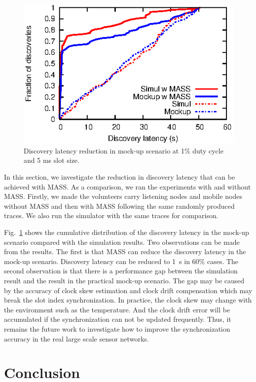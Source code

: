 \documentclass[twoside,twocolumn]{article}
\begin{document}
\begin{figure}[t]
   \centering
   \includegraphics{graphs/latency-mockup/latency-reduction}
   \caption{Discovery latency reduction in mock-up scenario at 1\% duty cycle and 5 ms slot size.}
   \label{fig:latency-reduction}
\end{figure}

In this section, we investigate the reduction in discovery latency that can be achieved with
MASS. As a comparison, we ran the experiments with and without MASS. Firstly, we made the volunteers
carry listening nodes and mobile nodes without MASS and then with MASS following the same randomly
produced traces. We also run the simulator with the same traces for comparison.

Fig.~\ref{fig:latency-reduction} shows the cumulative distribution of the discovery latency in the
mock-up scenario compared with the simulation results. Two observations can be made from the
results. The first is that MASS can reduce the discovery latency in the mock-up scenario. Discovery
latency can be reduced to 1~s in 60\% cases. The second observation is that there is a performance
gap between the simulation result and the result in the practical mock-up scenario. The gap may be
caused by the accuracy of clock skew estimation and clock drift compensation which may break the
slot index synchronization. In practice, the clock skew may change with the environment such as the 
temperature. And the clock drift error will be accumulated if the synchronization can not be updated 
frequently. Thus, it remains the future work to investigate how to improve the synchronization accuracy 
in the real large scale sensor networks.

\section{Conclusion}
\label{sec:conclusion}
\end{document}
